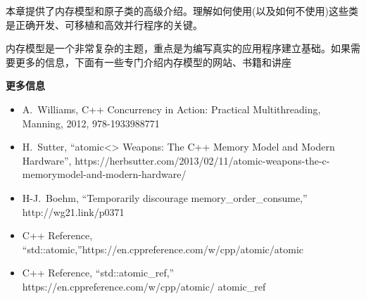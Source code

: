 
本章提供了内存模型和原子类的高级介绍。理解如何使用(以及如何不使用)这些类是正确开发、可移植和高效并行程序的关键。\par

内存模型是一个非常复杂的主题，重点是为编写真实的应用程序建立基础。如果需要更多的信息，下面有一些专门介绍内存模型的网站、书籍和讲座\par

\hspace*{\fill} \par %
\textbf{更多信息}

\begin{itemize}
	\item A. Williams, C++ Concurrency in Action: Practical 	Multithreading, Manning, 2012, 978-1933988771

	\item H. Sutter, “atomic<> Weapons: The C++ Memory Model and Modern Hardware”, https://herbsutter.com/2013/02/11/atomic-weapons-the-c-memorymodel-and-modern-hardware/
	\item H-J. Boehm, “Temporarily discourage memory\_order\_consume,” http://wg21.link/p0371
	\item C++ Reference,\\ “std::atomic,”https://en.cppreference.com/w/cpp/atomic/atomic
	\item C++ Reference, “std::atomic\_ref,” \\
	https://en.cppreference.com/w/cpp/atomic/
	atomic\_ref
\end{itemize}

\newpage
